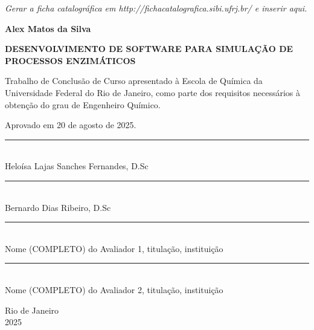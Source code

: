 \documentclass[12pt,oneside]{report}
\begin{document}
\newpage
{}
\vspace*{\fill}
\begin{center}
    \textit{Gerar a ficha catalográfica em http://fichacatalografica.sibi.ufrj.br/ e inserir aqui.}
\end{center}
\vspace*{\fill}
\newpage

\begin{center}
    \textbf{Alex Matos da Silva}

    \vspace{1cm}

    \textbf{DESENVOLVIMENTO DE SOFTWARE PARA SIMULAÇÃO DE PROCESSOS ENZIMÁTICOS}

    \vspace{0.5cm}

    \begin{adjustwidth}{8cm}{0cm}
        Trabalho de Conclusão de Curso apresentado à Escola de Química da Universidade Federal do Rio de Janeiro, como parte dos requisitos necessários à obtenção do grau de Engenheiro Químico.
    \end{adjustwidth}

    \vspace{0.5cm}

\end{center}

Aprovado em 20 de agosto de 2025.

\begin{center}

    \vspace{2cm}

    \noindent\rule{10cm}{0.4pt}\\
    \noindent\hspace*{0.2cm}Heloísa Lajas Sanches Fernandes, D.Sc

    \vspace{1cm}

    \noindent\rule{10cm}{0.4pt}\\
    \noindent\hspace*{0.2cm}Bernardo Dias Ribeiro, D.Sc

    \vspace{2cm}

    \noindent\rule{10cm}{0.4pt}\\
    \noindent\hspace*{0.2cm}Nome (COMPLETO) do Avaliador 1, titulação, instituição

    \vspace{1cm}

    \noindent\rule{10cm}{0.4pt}\\
    \noindent\hspace*{0.2cm}Nome (COMPLETO) do Avaliador 2, titulação, instituição


    \vfill

    Rio de Janeiro \\
    2025
\end{center}
\newpage
\end{document}
